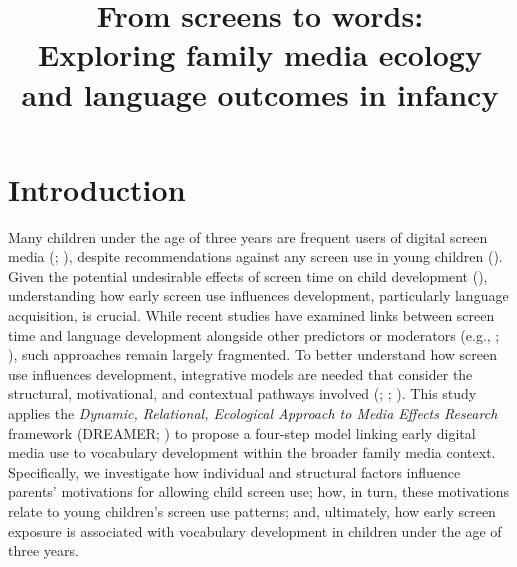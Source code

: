 \documentclass[
  man,
  floatsintext,
  longtable,
  nolmodern,
  notxfonts,
  notimes,
  colorlinks=true,linkcolor=blue,citecolor=blue,urlcolor=blue]{apa7}
\title{From screens to words:\\ Exploring family media ecology and
language outcomes in infancy}
\begin{document}
\maketitle



\setcounter{secnumdepth}{-\maxdimen} %

\setlength\LTleft{0pt}



\vspace{1em}
\section{Introduction}\label{introduction}

Many children under the age of three years are frequent users of digital
screen media (; ),
despite recommendations against any screen use in young children
(). Given the potential undesirable effects of
screen time on child development
(), understanding how early screen use influences development,
particularly language acquisition, is crucial. While recent studies have
examined links between screen time and language development alongside
other predictors or moderators (e.g.,
;
), such
approaches remain largely fragmented. To better understand how screen
use influences development, integrative models are needed that consider
the structural, motivational, and contextual pathways involved
(;
;
).
This study applies the \emph{Dynamic, Relational, Ecological Approach to
Media Effects Research} framework (DREAMER;
) to
propose a four-step model linking early digital media use to vocabulary
development within the broader family media context. Specifically, we
investigate how individual and structural factors influence parents'
motivations for allowing child screen use; how, in turn, these
motivations relate to young children's screen use patterns; and,
ultimately, how early screen exposure is associated with vocabulary
development in children under the age of three years.
\end{document}
